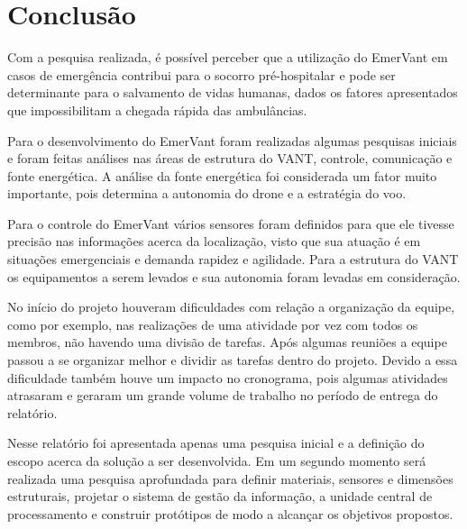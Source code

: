 \chapter{Conclusão}

Com a pesquisa realizada, é possível perceber que a utilização do EmerVant
em casos de emergência contribui para o socorro pré-hospitalar e pode ser determinante para o 
salvamento de vidas humanas, dados os fatores apresentados que impossibilitam a chegada rápida das ambulâncias.

Para o desenvolvimento do EmerVant foram realizadas algumas pesquisas iniciais e foram feitas análises nas áreas 
de estrutura do VANT, controle, comunicação e fonte energética. A análise da fonte energética foi considerada 
um fator muito importante, pois determina a autonomia do drone e a estratégia do voo. 

Para o controle do EmerVant vários sensores foram definidos para que ele tivesse precisão nas informações acerca da localização,
visto que sua atuação é em situações emergenciais e demanda rapidez e agilidade. Para a estrutura do VANT os equipamentos a serem
levados e sua autonomia foram levadas em consideração.

No início do projeto houveram dificuldades com relação a organização da equipe, como por exemplo, nas realizações
de uma atividade por vez com todos os membros, não havendo uma divisão de tarefas. Após algumas reuniões a equipe 
passou a se organizar melhor e dividir as tarefas dentro do projeto. Devido a essa dificuldade também houve um
impacto no cronograma, pois algumas atividades atrasaram e geraram um grande volume de trabalho no período de entrega do relatório.

Nesse relatório foi apresentada apenas uma pesquisa inicial e a definição do escopo acerca da solução a ser desenvolvida. 
Em um segundo momento será realizada uma pesquisa aprofundada para definir materiais, sensores e dimensões estruturais,
projetar o sistema de gestão da informação, a unidade central de processamento e construir protótipos de modo a alcançar os objetivos
propostos.